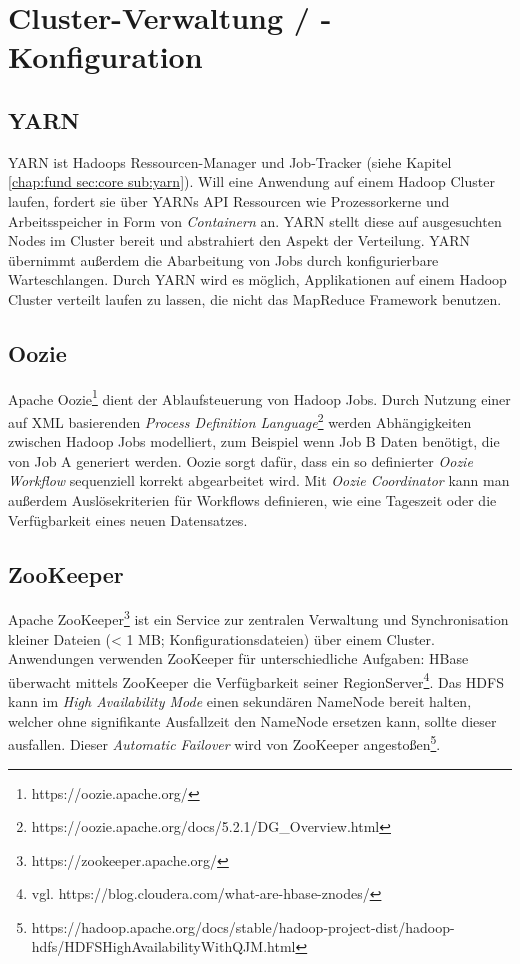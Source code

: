 \section{Cluster-Verwaltung / -Konfiguration}
\subsection{YARN}
YARN ist Hadoops Ressourcen-Manager und Job-Tracker (siehe Kapitel \ref{chap:fund sec:core sub:yarn}). Will eine Anwendung auf einem Hadoop Cluster laufen, fordert sie über YARNs API Ressourcen wie Prozessorkerne und Arbeitsspeicher in Form von \textit{Containern} an. YARN stellt diese auf ausgesuchten Nodes im Cluster bereit und abstrahiert den Aspekt der Verteilung. YARN übernimmt außerdem die Abarbeitung von Jobs durch konfigurierbare Warteschlangen. Durch YARN wird es möglich, Applikationen auf einem Hadoop Cluster verteilt laufen zu lassen, die nicht das MapReduce Framework benutzen.\parencite[vgl.][YARN -> Architecture]{noauthor_apache_nodate}
\subsection{Oozie}
Apache Oozie\footnote{https://oozie.apache.org/} dient der Ablaufsteuerung von Hadoop Jobs. Durch Nutzung einer auf XML basierenden \textit{Process Definition Language}\footnote{https://oozie.apache.org/docs/5.2.1/DG\_Overview.html} werden Abhängigkeiten zwischen Hadoop Jobs modelliert, zum Beispiel wenn Job B Daten benötigt, die von Job A generiert werden. Oozie sorgt dafür, dass ein so definierter \textit{Oozie Workflow} sequenziell korrekt abgearbeitet wird. Mit \textit{Oozie Coordinator} kann man außerdem Auslösekriterien für Workflows definieren, wie eine Tageszeit oder die Verfügbarkeit eines neuen Datensatzes. 
\subsection{ZooKeeper}
Apache ZooKeeper\footnote{https://zookeeper.apache.org/} ist ein Service zur zentralen Verwaltung und Synchronisation kleiner Dateien (< 1 MB; Konfigurationsdateien) über einem Cluster. Anwendungen verwenden ZooKeeper für unterschiedliche Aufgaben: HBase überwacht mittels ZooKeeper die Verfügbarkeit seiner RegionServer\footnote{vgl. https://blog.cloudera.com/what-are-hbase-znodes/}. Das HDFS kann im \textit{High Availability Mode} einen sekundären NameNode bereit halten, welcher ohne signifikante Ausfallzeit den NameNode ersetzen kann, sollte dieser ausfallen. Dieser \textit{Automatic Failover} wird von ZooKeeper angestoßen\footnote{https://hadoop.apache.org/docs/stable/hadoop-project-dist/hadoop-hdfs/HDFSHighAvailabilityWithQJM.html}.
